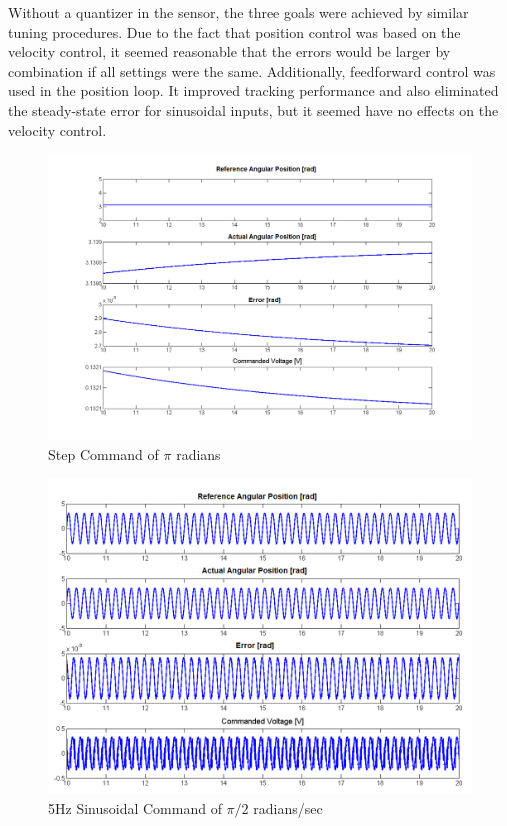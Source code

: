 \documentclass{article}
\theoremstyle{plain}
\theoremstyle{definition}
\theoremstyle{remark}
\begin{document}
Without a quantizer in the sensor, the three goals were achieved by similar tuning procedures. Due to the fact that position control was based on the velocity control, it seemed reasonable that the errors would be larger by combination if all settings were the same. Additionally, feedforward control was used in the position loop. It improved tracking performance and also eliminated the steady-state error for sinusoidal inputs, but it seemed have no effects on the velocity control.  

\begin{figure}[htb]
\begin{center}
\includegraphics[width = 14 cm]{q3_18}
\caption{Step Command of $\pi$ radians}
\label{q3_18}
\end{center}
\end{figure}

\begin{figure}[htb]
\begin{center}
\includegraphics[width = 14 cm]{q3_19}
\caption{5Hz Sinusoidal Command of $\pi/2$ radians/sec}
\label{q3_19}
\end{center}
\end{figure}
\end{document}
